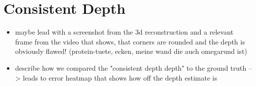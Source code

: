     \section{Consistent Depth}
        \begin{itemize}
            \item maybe lead with a screenshot from the 3d reconstruction and a relevant frame from the video that shows, that corners are rounded and the depth is obviously flawed! (protein-tuete, ecken, meine wand die auch omegarund ist)
            \item describe how we compared the "consistent depth depth" to the ground truth --> leads to error heatmap that shows how off the depth estimate is
        \end{itemize}